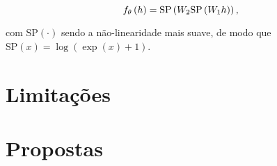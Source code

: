 \begin{equation}
    f_{\theta}\left(h\right) = \text{SP}\left(W_{2}\text{SP}\left(W_{1}h\right)\right),
    \label{eq:08461671_gan_arch}
    \vspace{0.2cm}
\end{equation}

\noindent com $\text{SP}\left(\cdot\right)$ sendo a não-linearidade mais suave, de modo que $\text{SP}\left(x\right) = \log\left(\exp\left(x\right) +1 \right)$.













\section{Limitações}
\label{sec:gan_for_bss_limitacoes}



\section{Propostas}
\label{sec:gan_for_bss_propositions}
